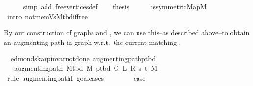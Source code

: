 \begin{isabellebody}
\ \ \ \ \isamarkupfalse%
\ {\isacharparenleft}{\kern0pt}simp\ add{\isacharcolon}{\kern0pt}\ free{\isacharunderscore}{\kern0pt}vertices{\isacharunderscore}{\kern0pt}def{\isacharparenright}{\kern0pt}\isanewline
\ \ \isamarkupfalse%
\ {\isacharquery}{\kern0pt}thesis\isanewline
\ \ \ \ \isamarkupfalse%
\ is{\isacharunderscore}{\kern0pt}symmetric{\isacharunderscore}{\kern0pt}Map{\isacharunderscore}{\kern0pt}M\isanewline
\ \ \ \ \isamarkupfalse%
\ {\isacharparenleft}{\kern0pt}intro\ not{\isacharunderscore}{\kern0pt}mem{\isacharunderscore}{\kern0pt}Vs{\isacharunderscore}{\kern0pt}M{\isacharunderscore}{\kern0pt}tbd{\isacharunderscore}{\kern0pt}if{\isacharunderscore}{\kern0pt}free{\isacharparenright}{\kern0pt}\isanewline
{}\isamarkupfalse%
%
\endisatagproof
{\isafoldproof}%
%
\isadelimproof
%
\endisadelimproof
%
\begin{isamarkuptext}%
By our construction of graphs  and , we can use
this--as described above--to obtain an augmenting path in graph  w.r.t.\ the current
matching .%
\end{isamarkuptext}\isamarkuptrue%
\isamarkupfalse%
\ {\isacharparenleft}{\kern0pt}\ edmonds{\isacharunderscore}{\kern0pt}karp{\isacharunderscore}{\kern0pt}invar{\isacharunderscore}{\kern0pt}not{\isacharunderscore}{\kern0pt}done{\isacharunderscore}{\kern0pt}{}{\isacharparenright}{\kern0pt}\ augmenting{\isacharunderscore}{\kern0pt}path{\isacharunderscore}{\kern0pt}p{\isacharunderscore}{\kern0pt}tbd{\isacharcolon}{\kern0pt}\isanewline
\ \ \ {\isachardoublequoteopen}augmenting{\isacharunderscore}{\kern0pt}path\ {\isacharparenleft}{\kern0pt}M{\isacharunderscore}{\kern0pt}tbd\ M{\isacharparenright}{\kern0pt}\ {\isacharparenleft}{\kern0pt}p{\isacharunderscore}{\kern0pt}tbd\ G\ L\ R\ s\ t\ M{\isacharparenright}{\kern0pt}{\isachardoublequoteclose}\isanewline
%
\isadelimproof
%
\endisadelimproof
%
\isatagproof
{}\isamarkupfalse%
\ {\isacharparenleft}{\kern0pt}rule\ augmenting{\isacharunderscore}{\kern0pt}pathI{\isacharcomma}{\kern0pt}\ goal{\isacharunderscore}{\kern0pt}cases{\isacharparenright}{\kern0pt}\isanewline
\ \ \isamarkupfalse%
\ {}\isanewline
\ \ \isamarkupfalse%
\ {\isacharquery}{\kern0pt}case\isanewline
\ \ \ \ \isamarkupfalse%

\end{isabellebody}
